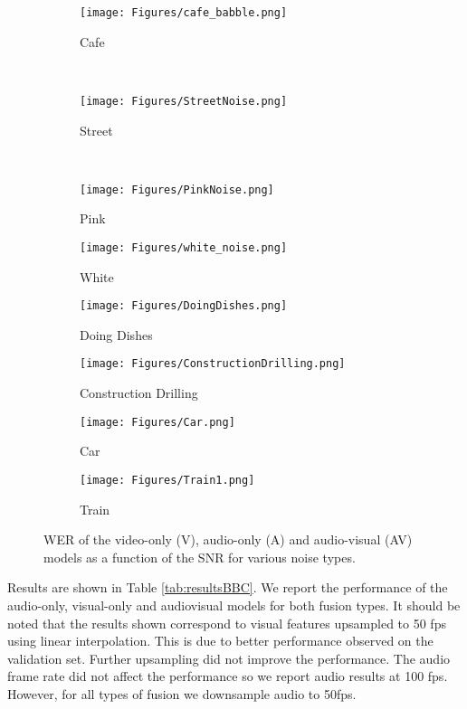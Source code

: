 \documentclass{article}
\begin{document}
\begin{figure*}
    \centering
    \begin{subfigure}[b]{0.35\textwidth}
        \texttt{[image: Figures/cafe\_babble.png]}
        \caption{Cafe}
        \label{fig:cafe}
    \end{subfigure}
    ~ \begin{subfigure}[b]{0.35\textwidth}
        \texttt{[image: Figures/StreetNoise.png]}
        \caption{Street}
        \label{fig:street}
    \end{subfigure}
    ~ \begin{subfigure}[b]{0.35\textwidth}
        \texttt{[image: Figures/PinkNoise.png]}
        \caption{Pink}
        \label{fig:pink}
    \end{subfigure}
    \begin{subfigure}[b]{0.35\textwidth}
        \texttt{[image: Figures/white\_noise.png]}
        \caption{White}
        \label{fig:white}
    \end{subfigure}
    \begin{subfigure}[b]{0.35\textwidth}
        \texttt{[image: Figures/DoingDishes.png]}
        \caption{Doing Dishes}
        \label{fig:doingDishes}
    \end{subfigure}
    \begin{subfigure}[b]{0.35\textwidth}
        \texttt{[image: Figures/ConstructionDrilling.png]}
        \caption{Construction Drilling}
        \label{fig:construction_drilling}
    \end{subfigure}
        \begin{subfigure}[b]{0.35\textwidth}
        \texttt{[image: Figures/Car.png]}
        \caption{Car}
        \label{fig:carNoise}
    \end{subfigure}
    \begin{subfigure}[b]{0.35\textwidth}
        \texttt{[image: Figures/Train1.png]}
        \caption{Train}
        \label{fig:train}
    \end{subfigure}
    \caption{WER of the video-only (V), audio-only (A) and audio-visual (AV) models as a function of the SNR for various noise types.}\label{fig:noiseTypes}
\end{figure*}

Results are shown in Table \ref{tab:resultsBBC}. We report the performance of the audio-only, visual-only and audiovisual models for both fusion types. It should be noted that the results shown correspond to visual features upsampled to 50 fps using linear interpolation. This is due to better performance observed on the validation set. Further upsampling did not improve the performance. The audio frame rate did not affect the performance so we report audio results at 100 fps. However, for all types of fusion we downsample audio to 50fps.
\end{document}
